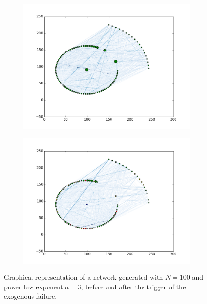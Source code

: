 \documentclass[a4paper, 11pt]{article}
\begin{document}
\begin{figure}[htbp]
    \centering
    \begin{subfigure}[b]{0.9\textwidth}
		\includegraphics[width=\textwidth]{images/network3.png}
	\end{subfigure}
    \begin{subfigure}[b]{0.9\textwidth}
		\includegraphics[width=\textwidth]{images/contagion3.png}
	\end{subfigure}
	\caption{Graphical representation of a network generated with $N = 100$ and power law exponent $a = 3$, before and after the trigger of the exogenous failure.}\label{fig:network3}
\end{figure}
\end{document}
